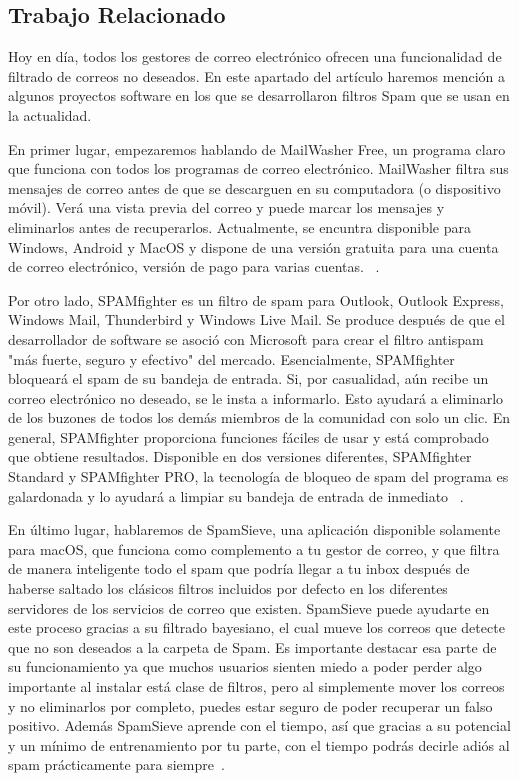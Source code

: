 \documentclass[conference,a4paper]{IEEEtran}
\begin{document}
                                                            


\subsection{Trabajo Relacionado}




Hoy en día, todos los gestores de correo electrónico ofrecen una funcionalidad de filtrado de correos no deseados. En este apartado del artículo haremos mención a algunos proyectos software en los que se desarrollaron filtros Spam que se usan en la actualidad.

En primer lugar, empezaremos hablando de MailWasher Free, un programa claro que funciona con todos los programas de correo electrónico. MailWasher filtra sus mensajes de correo antes de que se descarguen en su computadora (o dispositivo móvil). Verá una vista previa del correo y puede marcar los mensajes y eliminarlos antes de recuperarlos. Actualmente, se encuntra disponible para Windows, Android y MacOS y dispone de una versión gratuita para una cuenta de correo electrónico, versión de pago para varias cuentas.  ~\cite{b5}. 


Por otro lado, SPAMfighter es un filtro de spam para Outlook, Outlook Express, Windows Mail, Thunderbird y Windows Live Mail. Se produce después de que el desarrollador de software se asoció con Microsoft para crear el filtro antispam "más fuerte, seguro y efectivo" del mercado. Esencialmente, SPAMfighter bloqueará el spam de su bandeja de entrada. Si, por casualidad, aún recibe un correo electrónico no deseado, se le insta a informarlo. Esto ayudará a eliminarlo de los buzones de todos los demás miembros de la comunidad con solo un clic. En general, SPAMfighter proporciona funciones fáciles de usar y está comprobado que obtiene resultados. Disponible en dos versiones diferentes, SPAMfighter Standard y SPAMfighter PRO, la tecnología de bloqueo de spam del programa es galardonada y lo ayudará a limpiar su bandeja de entrada de inmediato ~\cite{b6}.



En último lugar, hablaremos de SpamSieve, una aplicación disponible solamente para macOS, que funciona como complemento a tu gestor de correo, y que filtra de manera inteligente todo el spam que podría llegar a tu inbox después de haberse saltado los clásicos filtros incluidos por defecto en los diferentes servidores de los servicios de correo que existen. SpamSieve puede ayudarte en este proceso gracias a su filtrado bayesiano, el cual mueve los correos que detecte que no son deseados a la carpeta de Spam. Es importante destacar esa parte de su funcionamiento ya que muchos usuarios sienten miedo a poder perder algo importante al instalar está clase de filtros, pero al simplemente mover los correos y no eliminarlos por completo, puedes estar seguro de poder recuperar un falso positivo. Además SpamSieve aprende con el tiempo, así que gracias a su potencial y un mínimo de entrenamiento por tu parte, con el tiempo podrás decirle adiós al spam prácticamente para siempre~\cite{b7}.
\end{document}
